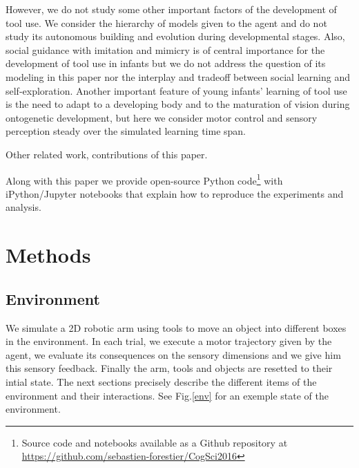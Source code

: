 \documentclass[10pt,letterpaper]{article}
\begin{document}
	However, we do not study some other important factors of the development of tool use.
	We consider the hierarchy of models given to the agent and do not study its autonomous building and evolution during developmental stages.
	Also, social guidance with imitation and mimicry is of central importance for the development of tool use in infants but we do not address the question
	of its modeling in this paper nor the interplay and tradeoff between social learning and self-exploration.
	Another important feature of young infants' learning of tool use is the need to adapt to a developing body and to the maturation of vision during ontogenetic development, 
	but here we consider motor control and sensory perception steady over the simulated learning time span.
	
	
	Other related work, contributions of this paper.
	\cite{ugur2015}
	\cite{schmerlinggoal}
	\cite{forestier2015}
	\cite{unifying}

	Along with this paper we provide open-source Python code\footnote{Source code and notebooks available as a Github repository at \url{https://github.com/sebastien-forestier/CogSci2016}} 
	with iPython/Jupyter notebooks that explain how to reproduce the experiments and analysis. 
	
	
%

\section{Methods}

	\subsection{Environment}
	
		We simulate a 2D robotic arm using tools to move an object into different boxes in the environment. 		
		In each trial, we execute a motor trajectory given by the agent, we evaluate its consequences on the sensory dimensions and we give him
		this sensory feedback. Finally the arm, tools and objects are resetted to their intial state.
		The next sections precisely describe the different items of the environment and their interactions.	
		See Fig.\ref{env} for an exemple state of the environment. 
		
\end{document}
